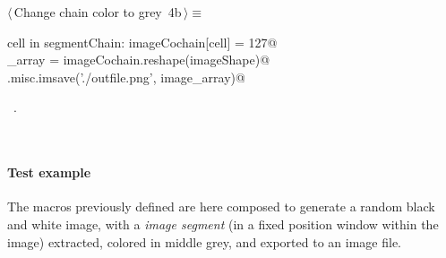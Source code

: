 \documentclass[11pt,oneside]{article}	%
\begin{document}
\begin{flushleft} \small
\begin{minipage}{\linewidth} \label{scrap7}
\protect{}$\langle\,$Change chain color to grey\nobreak\ {\footnotesize 4b}$\,\rangle\equiv$
\vspace{-1ex}
\begin{list}{}{} \item
\mbox{}\verb@for cell in segmentChain: imageCochain[cell] = 127@\\
\mbox{}\verb@image_array = imageCochain.reshape(imageShape)@\\
\mbox{}\verb@scipy.misc.imsave('./outfile.png', image_array)@\\
\mbox{}\verb@@{\NWsep}
\end{list}
\vspace{-1ex}
\footnotesize\addtolength{\baselineskip}{-1ex}
\begin{list}{}{\setlength{\itemsep}{-\parsep}\setlength{\itemindent}{-\leftmargin}}
\item \NWtxtMacroRefIn\ .
\end{list}
\end{minipage}\\[4ex]
\end{flushleft}


\paragraph{Test example}

The macros previously defined are here composed to generate a random black and white image, with a \emph{image segment} (in a fixed position window within the image) extracted, colored in middle grey, and exported to an image file.  
\end{document}
